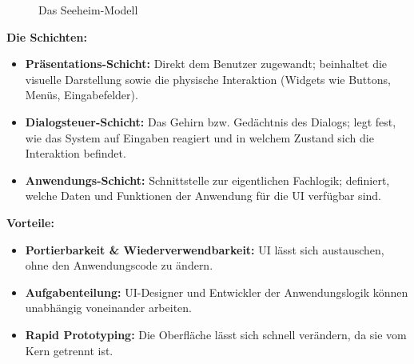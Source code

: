 \documentclass[12pt, a4paper]{article}
\begin{document}
\begin{figure}[H]
\centering
{}
\caption{Das Seeheim-Modell}
\end{figure}

\textbf{Die Schichten:}
\begin{itemize}
  \item \textbf{Präsentations-Schicht:} Direkt dem Benutzer zugewandt; beinhaltet
        die visuelle Darstellung sowie die physische Interaktion (Widgets wie Buttons,
        Menüs, Eingabefelder).
  \item \textbf{Dialogsteuer-Schicht:} Das \glqq{}Gehirn\grqq{} bzw. \glqq{}Gedächtnis\grqq{} des Dialogs;
        legt fest, wie das System auf Eingaben reagiert und in welchem Zustand sich
        die Interaktion befindet.
  \item \textbf{Anwendungs-Schicht:} Schnittstelle zur eigentlichen Fachlogik;
        definiert, welche Daten und Funktionen der Anwendung für die UI verfügbar sind.
\end{itemize}

\textbf{Vorteile:}
\begin{itemize}
  \item \textbf{Portierbarkeit \& Wiederverwendbarkeit:} UI lässt sich austauschen,
        ohne den Anwendungscode zu ändern.
  \item \textbf{Aufgabenteilung:} UI-Designer und Entwickler der Anwendungslogik
        können unabhängig voneinander arbeiten.
  \item \textbf{Rapid Prototyping:} Die Oberfläche lässt sich schnell verändern,
        da sie vom Kern getrennt ist.
\end{itemize}
\end{document}
